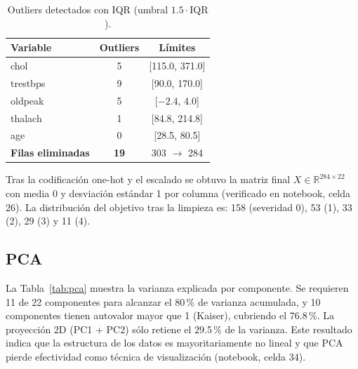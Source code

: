 \documentclass[11pt,a4paper]{article}
\begin{document}
\begin{table}[H]
  \centering
  \caption{Outliers detectados con IQR (umbral $1.5 \cdot \mathrm{IQR}$).}
  \label{tab:outliers}
  \begin{tabular}{@{}lcc@{}}
    \toprule
    \textbf{Variable} & \textbf{Outliers} & \textbf{Límites} \\
    \midrule
    chol & 5 & [115.0, 371.0] \\
    trestbps & 9 & [90.0, 170.0] \\
    oldpeak & 5 & [$-2.4$, 4.0] \\
    thalach & 1 & [84.8, 214.8] \\
    age & 0 & [28.5, 80.5] \\
    \midrule
    \textbf{Filas eliminadas} & \textbf{19} & 303 $\rightarrow$ 284 \\
    \bottomrule
  \end{tabular}
\end{table}

Tras la codificación one-hot y el escalado se obtuvo la matriz final $X \in
\mathbb{R}^{284 \times 22}$ con media 0 y desviación estándar 1 por columna (verificado en
notebook, celda 26). La distribución del objetivo tras la limpieza es: 158 (severidad 0),
53 (1), 33 (2), 29 (3) y 11 (4).

\subsection{PCA}

La Tabla~\ref{tab:pca} muestra la varianza explicada por componente. Se requieren 11 de 22
componentes para alcanzar el 80\,\% de varianza acumulada, y 10 componentes tienen autovalor
mayor que 1 (Kaiser), cubriendo el 76.8\,\%. La proyección 2D (PC1 + PC2) sólo retiene el
29.5\,\% de la varianza. Este resultado indica que la estructura de los datos es
mayoritariamente no lineal y que PCA pierde efectividad como técnica de visualización
(notebook, celda 34).
\end{document}
